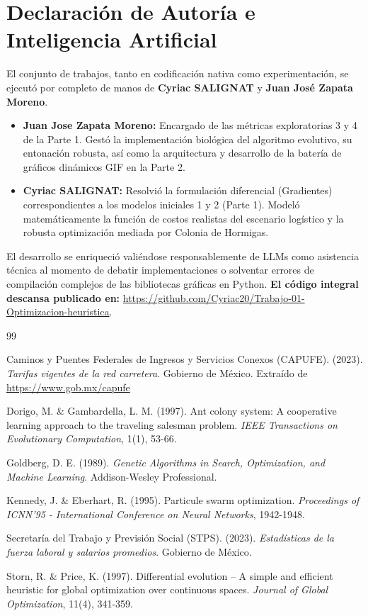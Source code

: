 \documentclass[11pt,a4paper]{article}
\begin{document}
\section{Declaración de Autoría e Inteligencia Artificial}

El conjunto de trabajos, tanto en codificación nativa como experimentación, se ejecutó por completo de manos de \textbf{Cyriac SALIGNAT} y \textbf{Juan José Zapata Moreno}. 

\begin{itemize}
    \item \textbf{Juan Jose Zapata Moreno:} Encargado de las métricas exploratorias 3 y 4 de la Parte 1. Gestó la implementación biológica del algoritmo evolutivo, su entonación robusta, así como la arquitectura y desarrollo de la batería de gráficos dinámicos GIF en la Parte 2.
    \item \textbf{Cyriac SALIGNAT:} Resolvió la formulación diferencial (Gradientes) correspondientes a los modelos iniciales 1 y 2 (Parte 1). Modeló matemáticamente la función de costos realistas del escenario logístico y la robusta optimización mediada por Colonia de Hormigas.
\end{itemize}

El desarrollo se enriqueció valiéndose responsablemente de LLMs como asistencia técnica al momento de debatir implementaciones o solventar errores de compilación complejos de las bibliotecas gráficas en Python. \textbf{El código integral descansa publicado en:} \url{https://github.com/Cyriac20/Trabajo-01-Optimizacion-heuristica}.

\renewcommand{\refname}{Bibliografía}
\begin{thebibliography}{99}

 Caminos y Puentes Federales de Ingresos y Servicios Conexos (CAPUFE). (2023). \textit{Tarifas vigentes de la red carretera}. Gobierno de México. Extraído de \url{https://www.gob.mx/capufe}

 Dorigo, M. \& Gambardella, L. M. (1997). Ant colony system: A cooperative learning approach to the traveling salesman problem. \textit{IEEE Transactions on Evolutionary Computation}, 1(1), 53-66.

 Goldberg, D. E. (1989). \textit{Genetic Algorithms in Search, Optimization, and Machine Learning}. Addison-Wesley Professional.

 Kennedy, J. \& Eberhart, R. (1995). Particule swarm optimization. \textit{Proceedings of ICNN'95 - International Conference on Neural Networks}, 1942-1948.

 Secretaría del Trabajo y Previsión Social (STPS). (2023). \textit{Estadísticas de la fuerza laboral y salarios promedios}. Gobierno de México.

 Storn, R. \& Price, K. (1997). Differential evolution – A simple and efficient heuristic for global optimization over continuous spaces. \textit{Journal of Global Optimization}, 11(4), 341-359.

\end{thebibliography}
\end{document}
